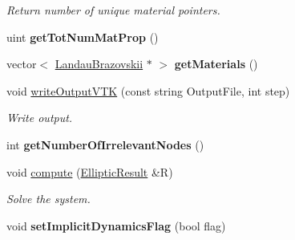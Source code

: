 \begin{DoxyCompactItemize}
\begin{DoxyCompactList}\small\item\em Return number of unique material pointers. \item\end{DoxyCompactList}\item 
\hypertarget{classvoom_1_1_l_b_model_a8249ae1f3e5b36914315b8b30c0262a1}{
uint {\bfseries getTotNumMatProp} ()}
\label{classvoom_1_1_l_b_model_a8249ae1f3e5b36914315b8b30c0262a1}

\item 
\hypertarget{classvoom_1_1_l_b_model_a95ec220bc582a7ef720fabfb3e645eb1}{
vector$<$ \hyperlink{classvoom_1_1_landau_brazovskii}{LandauBrazovskii} $\ast$ $>$ {\bfseries getMaterials} ()}
\label{classvoom_1_1_l_b_model_a95ec220bc582a7ef720fabfb3e645eb1}

\item 
\hypertarget{classvoom_1_1_l_b_model_a7578f02f8b7cf51a8deacb7537d30dc2}{
void \hyperlink{classvoom_1_1_l_b_model_a7578f02f8b7cf51a8deacb7537d30dc2}{writeOutputVTK} (const string OutputFile, int step)}
\label{classvoom_1_1_l_b_model_a7578f02f8b7cf51a8deacb7537d30dc2}

\begin{DoxyCompactList}\small\item\em Write output. \item\end{DoxyCompactList}\item 
\hypertarget{classvoom_1_1_l_b_model_a11632c9eb952c92b771ecddba72e9ba2}{
int {\bfseries getNumberOfIrrelevantNodes} ()}
\label{classvoom_1_1_l_b_model_a11632c9eb952c92b771ecddba72e9ba2}

\item 
\hypertarget{classvoom_1_1_l_b_model_adf89f36be8192b2a03b1f6471fb41288}{
void \hyperlink{classvoom_1_1_l_b_model_adf89f36be8192b2a03b1f6471fb41288}{compute} (\hyperlink{structvoom_1_1_elliptic_result}{EllipticResult} \&R)}
\label{classvoom_1_1_l_b_model_adf89f36be8192b2a03b1f6471fb41288}

\begin{DoxyCompactList}\small\item\em Solve the system. \item\end{DoxyCompactList}\item 
\hypertarget{classvoom_1_1_l_b_model_a38bb84e4e37d45ce0e89faaa6cc86f92}{
void {\bfseries setImplicitDynamicsFlag} (bool flag)}
\label{classvoom_1_1_l_b_model_a38bb84e4e37d45ce0e89faaa6cc86f92}

\end{DoxyCompactItemize}
